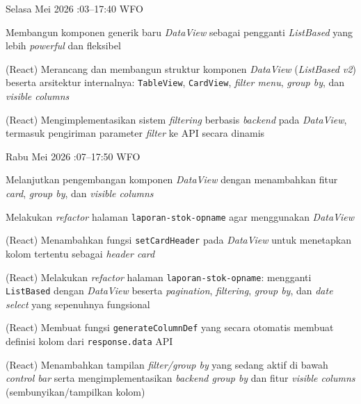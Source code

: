 \begin{logtable}
    {
        Selasa  Mei 2026 :03--17:40 \linebreak %
        WFO
    }{
        \begin{loglist}
            \item Membangun komponen generik baru \textit{DataView} sebagai pengganti
            \textit{ListBased} yang lebih \textit{powerful} dan fleksibel
        \end{loglist}
    }{
        \begin{logwork}
            \item (React) Merancang dan membangun struktur komponen \textit{DataView} (\textit{ListBased v2}) beserta arsitektur internalnya: \texttt{TableView}, \texttt{CardView}, \textit{filter menu}, \textit{group by}, dan \textit{visible columns}
            \item (React) Mengimplementasikan sistem \textit{filtering} berbasis \textit{backend} pada \textit{DataView}, termasuk pengiriman parameter \textit{filter} ke API secara dinamis
        \end{logwork}
    }

    {
        Rabu  Mei 2026 :07--17:50 \linebreak %
        WFO
    }{
        \begin{loglist}
            \item Melanjutkan pengembangan komponen \textit{DataView} dengan menambahkan fitur
            \textit{card}, \textit{group by}, dan \textit{visible columns}
            \item Melakukan \textit{refactor} halaman \texttt{laporan-stok-opname} agar
            menggunakan \textit{DataView}
        \end{loglist}
    }{
        \begin{logwork}
            \item (React) Menambahkan fungsi \texttt{setCardHeader} pada \textit{DataView} untuk menetapkan kolom tertentu sebagai \textit{header card}
            \item (React) Melakukan \textit{refactor} halaman \texttt{laporan-stok-opname}: mengganti \texttt{ListBased} dengan \textit{DataView} beserta \textit{pagination}, \textit{filtering}, \textit{group by}, dan \textit{date select} yang sepenuhnya fungsional
            \item (React) Membuat fungsi \texttt{generateColumnDef} yang secara otomatis membuat definisi kolom dari \texttt{response.data} API
            \item (React) Menambahkan tampilan \textit{filter/group by} yang sedang aktif di bawah \textit{control bar} serta mengimplementasikan \textit{backend group by} dan fitur \textit{visible columns} (sembunyikan/tampilkan kolom)
        \end{logwork}
    }


\end{logtable}
